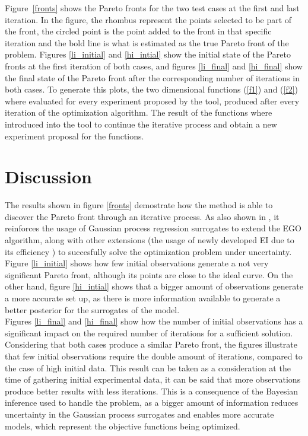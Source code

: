 \documentclass{article}
\begin{document}
Figure~\ref{fronts} shows the Pareto fronts for the two test cases at the first and last iteration. In the figure, the rhombus represent the points selected to be part of the front, the circled point is the point added to the front in that specific iteration and the bold line is what is estimated as the true Pareto front of the problem. Figures \ref{li_initial} and \ref{hi_intial} show the initial state of the Pareto fronts at the first iteration of both cases, and figures \ref{li_final} and \ref{hi_final} show the final state of the Pareto front after the corresponding number of iterations in both cases. To generate this plots, the two dimensional functions (\ref{f1}) and (\ref{f2}) where evaluated for every experiment proposed by the tool, produced after every iteration of the optimization algorithm. The result of the functions where introduced into the tool to continue the iterative process and obtain a new experiment proposal for the functions.

\section{Discussion}

The results shown in figure \ref{fronts} demostrate how the method is able to discover the Pareto front through an iterative process. As also shown in \cite{Huang2006}, it reinforces the usage of Gaussian process regression surrogates to extend the EGO algorithm, along with other extensions (the usage of newly developed EI due to its efficiency \cite{Jones1998}) to succesfully solve the optimization problem under uncertainty.\\

Figure \ref{li_initial} shows how few initial observations generate a not very significant Pareto front, although its points are close to the ideal curve. On the other hand, figure \ref{hi_intial} shows that a bigger amount of observations generate a more accurate set up, as there is more information available to generate a better posterior for the surrogates of the model.\\

Figures \ref{li_final} and \ref{hi_final} show how the number of initial observations has a significant impact on the required number of iterations for a sufficient solution. Considering that both cases produce a similar Pareto front, the figures illustrate that few initial observations require the double amount of iterations, compared to the case of high initial data. This result can be taken as a consideration at the time of gathering initial experimental data, it can be said that more observations produce better results with less iterations. This is a consequence of the Bayesian inference used to handle the problem, as a bigger amount of information reduces uncertainty in the Gaussian process surrogates and enables more accurate models, which represent the objective functions being optimized.\\
\end{document}
